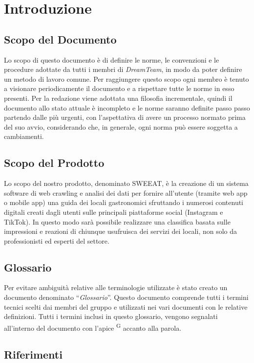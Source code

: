 \section{Introduzione}

\subsection{Scopo del Documento}
Lo scopo di questo documento è di definire le norme, le convenzioni e le procedure adottate da tutti i membri di \textit{DreamTeam}, in modo da poter definire un metodo di lavoro comune.
Per raggiungere questo scopo ogni membro è tenuto a visionare periodicamente il documento e a rispettare tutte le norme in esso presenti. 
Per la redazione viene adottata una filosofia incrementale, quindi il documento allo stato attuale è incompleto e le norme saranno definite passo passo partendo dalle più urgenti, con l'aspettativa di avere un processo normato prima del suo avvio, considerando che, in generale, ogni norma può essere soggetta a cambiamenti.


\subsection{Scopo del Prodotto}
Lo scopo del nostro prodotto, denominato SWEEAT, è la creazione di un sistema software di web crawling e analisi dei dati per fornire all'utente (tramite web app o mobile app) una guida dei locali gastronomici sfruttando i numerosi contenuti digitali creati dagli utenti sulle principali piattaforme social (Instagram e TikTok). In questo modo sarà possibile realizzare una classifica basata sulle impressioni e reazioni di chiunque usufruisca dei servizi dei locali, non solo da professionisti ed esperti del settore.

\subsection{Glossario}
Per evitare ambiguità relative alle terminologie utilizzate è stato creato un documento denominato “\textit{Glossario}”. Questo documento comprende tutti i termini tecnici scelti dai membri del gruppo e utilizzati nei vari documenti con le relative definizioni. Tutti i termini inclusi in questo glossario, vengono segnalati all’interno del documento con l’apice \textsuperscript{G} accanto alla parola.

\subsection{Riferimenti}